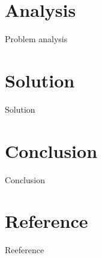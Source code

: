 \documentclass{beamer}
\begin{document}
\section{Analysis}
\begin{frame}{Problem analysis}
\end{frame}
\section{Solution}
\begin{frame}{Solution}
\end{frame}
\section{Conclusion}
\begin{frame}{Conclusion}
\end{frame}
\section{Reference}
\begin{frame}{Reeference}
\end{frame}
\end{document}
